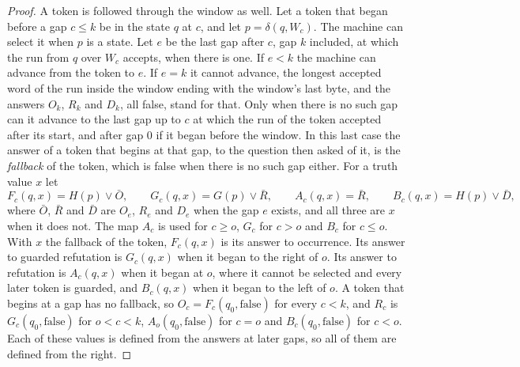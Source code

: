 \documentclass[11pt,a4paper]{article}
\theoremstyle{definition}
\theoremstyle{plain}
\begin{document}
\begin{proof}
A token is followed through the window as well. Let a token that began before a gap $c \leq k$ be in the state $q$ at
$c$, and let $p = \delta(q, W_c)$. The machine can select it when $p$ is a state. Let $e$ be the last gap after $c$, gap
$k$ included, at which the run from $q$ over $W_c$ accepts, when there is one. If $e < k$ the machine can advance from
the token to $e$. If $e = k$ it cannot advance, the longest accepted word of the run inside the window ending with the
window's last byte, and the answers $O_k$, $R_k$ and $D_k$, all false, stand for that. Only when there is no such gap
can it advance to the last gap up to $c$ at which the run of the token accepted after its start, and after gap $0$ if it
began before the window. In this last case the answer of a token that begins at that gap, to the question then asked of
it, is the \emph{fallback} of the token, which is false when there is no such gap either. For a truth value $x$ let
\[ F_c(q, x) = H(p) \vee \bar{O}, \qquad G_c(q, x) = G(p) \vee \bar{R}, \qquad A_c(q, x) = \bar{R}, \qquad
B_c(q, x) = H(p) \vee \bar{D}, \] where $\bar{O}$, $\bar{R}$ and $\bar{D}$ are $O_e$, $R_e$ and $D_e$ when the gap $e$
exists, and all three are $x$ when it does not. The map $A_c$ is used for $c \geq o$, $G_c$ for $c > o$ and $B_c$ for
$c \leq o$. With $x$ the fallback of the token, $F_c(q, x)$ is its answer to occurrence. Its answer to guarded
refutation is $G_c(q, x)$ when it began to the right of $o$. Its answer to refutation is $A_c(q, x)$ when it began at
$o$, where it cannot be selected and every later token is guarded, and $B_c(q, x)$ when it began to the left of $o$. A
token that begins at a gap has no fallback, so $O_c = F_c(q_0, \text{false})$ for every $c < k$, and $R_c$ is
$G_c(q_0, \text{false})$ for $o < c < k$, $A_o(q_0, \text{false})$ for $c = o$ and $B_c(q_0, \text{false})$ for $c < o$.
Each of these values is defined from the answers at later gaps, so all of them are defined from the right.


\end{proof}
\end{document}
